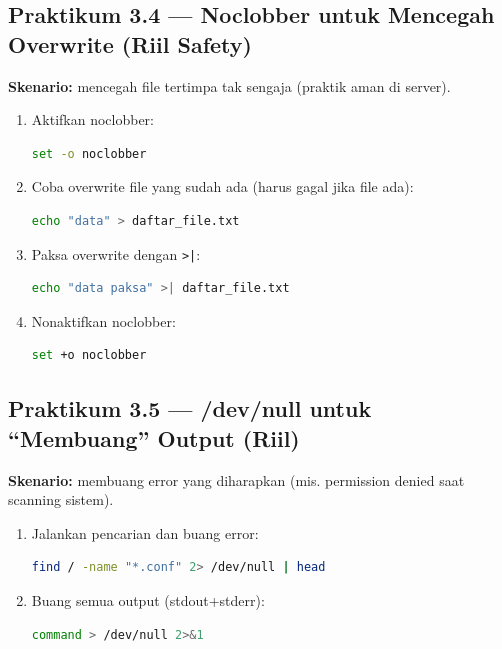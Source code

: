 \subsection*{Praktikum 3.4 --- Noclobber untuk Mencegah Overwrite (Riil Safety)}
\textbf{Skenario:} mencegah file tertimpa tak sengaja (praktik aman di server).

\begin{enumerate}
    \item Aktifkan noclobber:
\begin{lstlisting}[language=bash, caption={Aktifkan noclobber}]
set -o noclobber
\end{lstlisting}

    \item Coba overwrite file yang sudah ada (harus gagal jika file ada):
\begin{lstlisting}[language=bash, caption={Overwrite diblokir noclobber}]
echo "data" > daftar_file.txt
\end{lstlisting}

    \item Paksa overwrite dengan \texttt{>|}:
\begin{lstlisting}[language=bash, caption={Paksa overwrite}]
echo "data paksa" >| daftar_file.txt
\end{lstlisting}

    \item Nonaktifkan noclobber:
\begin{lstlisting}[language=bash, caption={Nonaktifkan noclobber}]
set +o noclobber
\end{lstlisting}
\end{enumerate}

\subsection*{Praktikum 3.5 --- /dev/null untuk ``Membuang'' Output (Riil)}
\textbf{Skenario:} membuang error yang diharapkan (mis. permission denied saat scanning sistem).

\begin{enumerate}
    \item Jalankan pencarian dan buang error:
\begin{lstlisting}[language=bash, caption={Buang stderr ke /dev/null}]
find / -name "*.conf" 2> /dev/null | head
\end{lstlisting}

    \item Buang semua output (stdout+stderr):
\begin{lstlisting}[language=bash, caption={Buang semua output}]
command > /dev/null 2>&1
\end{lstlisting}
\end{enumerate}

